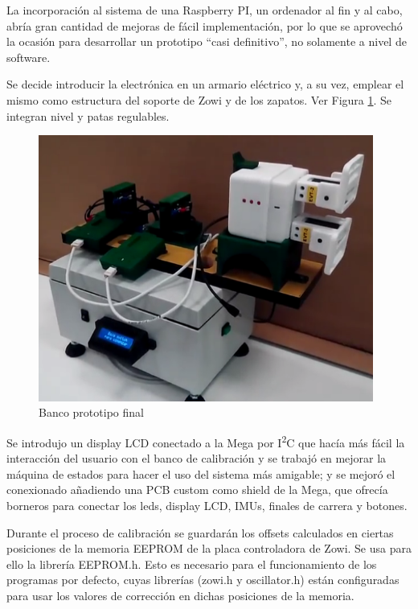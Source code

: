 La incorporación al sistema de una Raspberry PI, un ordenador al fin y al cabo, abría gran cantidad de mejoras de fácil implementación, por lo que se aprovechó la ocasión para desarrollar un prototipo ``casi definitivo'', no solamente a nivel de software.

Se decide introducir la electrónica en un armario eléctrico y, a su vez, emplear el mismo como estructura del soporte de Zowi y de los zapatos. Ver Figura \ref{fig:bancov4}. Se integran nivel y patas regulables.

\begin{figure}
\centering
\includegraphics[width=110mm]{Figures/banco_v4}
\caption{Banco prototipo final}
\label{fig:bancov4}
\end{figure}

Se introdujo un display LCD conectado a la Mega por I\textsuperscript{2}C que hacía más fácil la interacción del usuario con el banco de calibración y se trabajó en mejorar la máquina de estados para hacer el uso del sistema más amigable; y se mejoró el conexionado añadiendo una PCB custom como shield de la Mega, que ofrecía borneros para conectar los leds, display LCD, IMUs, finales de carrera y botones.

Durante el proceso de calibración se guardarán los offsets calculados en ciertas posiciones de la memoria EEPROM de la placa controladora de Zowi. Se usa para ello la librería EEPROM.h. Esto es necesario para el funcionamiento de los programas por defecto, cuyas librerías (zowi.h y oscillator.h) están configuradas para usar los valores de corrección en dichas posiciones de la memoria.

